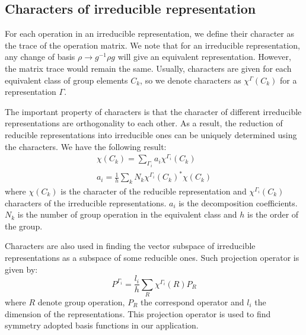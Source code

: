 \documentclass{article}
\begin{document}
\subsection{Characters of irreducible representation}
For each operation in an irreducible representation, we define their character 
as the trace of the operation matrix. We note that for an irreducible representation, 
any change of basis $\rho \to g^{-1}\rho{g}$ will give an equivalent representation. However,
the matrix trace would remain the same. Usually, characters are given for each equivalent 
class of group elements $C_k$, so we denote characters as $\chi^{\Gamma}(C_k)$ for a 
representation $\Gamma$\cite{serre_linear_1996}.

The important property of characters is that the character of different irreducible 
representations are orthogonality to each other. As a result, the reduction of 
reducible representations into irreducible ones can be uniquely determined using the 
characters. We have the following result\cite{dresselhaus_group_2008}:
\begin{gather}
    \chi(C_k) = \sum_{\Gamma_i} a_i \chi^{\Gamma_i}(C_k) \\
    a_i = \frac{1}{h} \sum_{k} N_k \chi^{\Gamma_i}(C_k)^* \chi(C_k)
\end{gather}
where $\chi(C_k)$ is the character of the reducible representation and $\chi^{\Gamma_i}(C_k)$
characters of the irreducible representations. $a_i$ is the decomposition coefficients.
$N_k$ is the number of group operation in the equivalent class and $h$ is the order of the group.

Characters are also used in finding the vector subspace of irreducible representations
as a subspace of some reducible ones. Such projection operator is given by:
\begin{equation}
    P^{\Gamma_i} = \frac{l_i}{h}\sum_R \chi^{\Gamma_i}(R) P_R
\end{equation}
where $R$ denote group operation, $P_R$ the correspond operator and $l_i$ the dimension of the 
representations. This projection operator is used to find symmetry adopted basis functions 
in our application.
\end{document}
